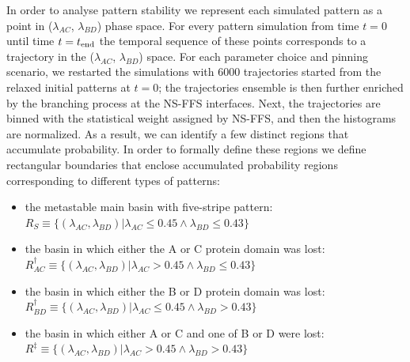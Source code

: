 \documentclass[a4paper,10pt]{article}
\newcommand{\Hb}{{\it Hb}\xspace}
\newcommand{\Kni}{{\it Kni}\xspace}
\newcommand{\GA}{A\xspace}
\newcommand{\GB}{B\xspace}
\newcommand{\GC}{C\xspace}
\newcommand{\GD}{D\xspace}
\begin{document}
In order to analyse pattern stability we represent each simulated pattern as a point in ($\lambda_{AC}$, $\lambda_{BD}$) phase space. For every pattern simulation from time $t=0$ until time $t=t_{\rm end}$ the temporal sequence of these points corresponds to a trajectory in the ($\lambda_{AC}$, $\lambda_{BD}$) space. For each parameter choice and pinning scenario, we restarted the simulations with 6000 trajectories started from the relaxed initial patterns at $t=0$; the trajectories ensemble is then further enriched by the branching process at the NS-FFS interfaces. Next, the trajectories are binned with the statistical weight assigned by NS-FFS, and then the histograms are normalized. As a result, we can identify a few distinct regions that accumulate probability. In order to formally define these regions we define rectangular boundaries that enclose accumulated probability regions corresponding to different types of patterns:
\begin{itemize}
 \item the metastable main basin with five-stripe pattern:\\
       $R_S\equiv\{(\lambda_{AC}, \lambda_{BD}) | {\lambda_{AC}\leq 0.45 \wedge \lambda_{BD}\leq 0.43} \}$
 \item the basin in which either the \GA or \GC protein domain was lost:\\
       $R^\dagger_{AC}\equiv\{(\lambda_{AC}, \lambda_{BD}) | {\lambda_{AC} > 0.45 \wedge \lambda_{BD}\leq 0.43} \}$
 \item the basin in which either the \GB or \GD protein domain was lost:\\
       $R^\dagger_{BD}\equiv\{(\lambda_{AC}, \lambda_{BD}) | {\lambda_{AC} \leq 0.45 \wedge \lambda_{BD} > 0.43} \}$
 \item the basin in which either \GA or \GC and one of \GB or \GD were lost:\\
       $R^\ddagger\equiv\{(\lambda_{AC}, \lambda_{BD}) | {\lambda_{AC} > 0.45 \wedge \lambda_{BD} > 0.43} \}$
\end{itemize}
\end{document}
